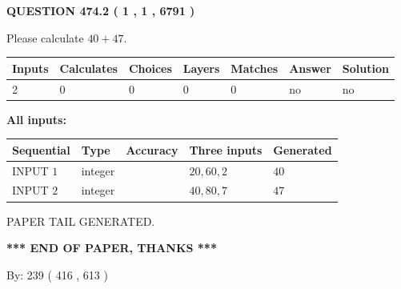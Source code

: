 \documentclass[12pt]{article}
\begin{document}
   
  
\vspace{0.2in}
  
{\textbf{\Large{QUESTION
474.2 
 ( 1 , 1 , 6791 )
}}}
  
  
 
Please calculate $ %
40 +  %
47 $.
 
 
   
   
   
   
\noindent\begin{tabular}{|l|l|l|l|l|l|l|}
 \hline
Inputs & Calculates & Choices & Layers & Matches & Answer & Solution \\ \hline
 2  & 
 0  & 
 0
  & 
 0  & 
 0  & 
  no & 
  no 
  \\ \hline
 \end{tabular}
   
   
   
   
\noindent{}
   
   
   
   
\noindent\vspace{0.1in}\hspace{-0.08in} {\textbf{\Large{All inputs: }}}
   
   
  
  
\noindent\begin{tabular}{|l|l|l|l|l|}
\hline
 Sequential & Type & Accuracy & Three inputs & Generated \\ 
\hline
 
 
  INPUT $  1 $ & integer &  & $
 20
 , 
 60
 , 
 2
 $ & $ 40 $ 
 \\  \hline  
 
 
  INPUT $  2 $ & integer &  & $
 40
 , 
 80
 , 
 7
 $ & $ 47 $ 
 \\  \hline  
 \end{tabular}
   
   
   
   
   
   
 \vspace{0.2in}
 
   
   
\vspace{2.0in} PAPER TAIL GENERATED.
   
   
   
   
\vspace{1.0in} 
{\textbf{\large{ *** END OF PAPER, THANKS *** }}} 
   
   
\hspace{1.0in} By: 
 239 ( 416 ,  613 )
   
\end{document}
